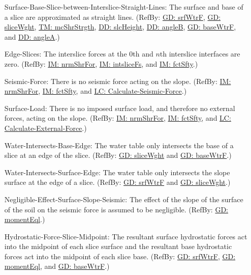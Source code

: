 \documentclass[12pt]{article}
\begin{document}
\begin{itemize}
\item[Surface-Base-Slice-between-Interslice-Straight-Lines:\phantomsection\label{assumpSBSBISL}]The surface and base of a slice are approximated as straight lines. (RefBy: \hyperref[GD:srfWtrF]{GD: srfWtrF}, \hyperref[GD:sliceWght]{GD: sliceWght}, \hyperref[TM:mcShrStrgth]{TM: mcShrStrgth}, \hyperref[DD:slcHeight]{DD: slcHeight}, \hyperref[DD:angleB]{DD: angleB}, \hyperref[GD:baseWtrF]{GD: baseWtrF}, and \hyperref[DD:angleA]{DD: angleA}.)
\item[Edge-Slices:\phantomsection\label{assumpES}]The interslice forces at the 0th and $n$th interslice interfaces are zero. (RefBy: \hyperref[IM:nrmShrFor]{IM: nrmShrFor}, \hyperref[IM:intsliceFs]{IM: intsliceFs}, and \hyperref[IM:fctSfty]{IM: fctSfty}.)
\item[Seismic-Force:\phantomsection\label{assumpSF}]There is no seismic force acting on the slope. (RefBy: \hyperref[IM:nrmShrFor]{IM: nrmShrFor}, \hyperref[IM:fctSfty]{IM: fctSfty}, and \hyperref[LC_seismic]{LC: Calculate-Seismic-Force}.)
\item[Surface-Load:\phantomsection\label{assumpSL}]There is no imposed surface load, and therefore no external forces, acting on the slope. (RefBy: \hyperref[IM:nrmShrFor]{IM: nrmShrFor}, \hyperref[IM:fctSfty]{IM: fctSfty}, and \hyperref[LC_external]{LC: Calculate-External-Force}.)
\item[Water-Intersects-Base-Edge:\phantomsection\label{assumpWIBE}]The water table only intersects the base of a slice at an edge of the slice. (RefBy: \hyperref[GD:sliceWght]{GD: sliceWght} and \hyperref[GD:baseWtrF]{GD: baseWtrF}.)
\item[Water-Intersects-Surface-Edge:\phantomsection\label{assumpWISE}]The water table only intersects the slope surface at the edge of a slice. (RefBy: \hyperref[GD:srfWtrF]{GD: srfWtrF} and \hyperref[GD:sliceWght]{GD: sliceWght}.)
\item[Negligible-Effect-Surface-Slope-Seismic:\phantomsection\label{assumpNESSS}]The effect of the slope of the surface of the soil on the seismic force is assumed to be negligible. (RefBy: \hyperref[GD:momentEql]{GD: momentEql}.)
\item[Hydrostatic-Force-Slice-Midpoint:\phantomsection\label{assumpHFSM}]The resultant surface hydrostatic forces act into the midpoint of each slice surface and the resultant base hydrostatic forces act into the midpoint of each slice base. (RefBy: \hyperref[GD:srfWtrF]{GD: srfWtrF}, \hyperref[GD:momentEql]{GD: momentEql}, and \hyperref[GD:baseWtrF]{GD: baseWtrF}.)
\end{itemize}
\end{document}
